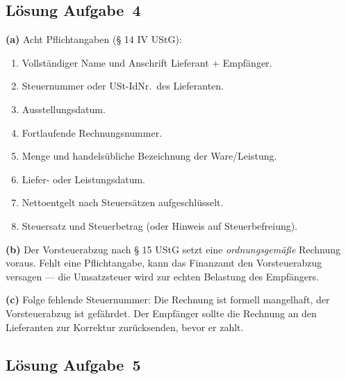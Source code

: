\documentclass[11pt, a4paper]{article}
\begin{document}
\subsection*{Lösung Aufgabe~4}

\begin{loesung}
\textbf{(a)} Acht Pflichtangaben (§ 14 IV UStG):
\begin{enumerate}[itemsep=0pt]
  \item Vollständiger Name und Anschrift Lieferant + Empfänger.
  \item Steuernummer oder USt-IdNr.\ des Lieferanten.
  \item Ausstellungsdatum.
  \item Fortlaufende Rechnungsnummer.
  \item Menge und handelsübliche Bezeichnung der Ware/Leistung.
  \item Liefer- oder Leistungsdatum.
  \item Nettoentgelt nach Steuersätzen aufgeschlüsselt.
  \item Steuersatz und Steuerbetrag (oder Hinweis auf Steuerbefreiung).
\end{enumerate}

\textbf{(b)} Der Vorsteuerabzug nach § 15 UStG setzt eine \emph{ordnungsgemäße}
Rechnung voraus. Fehlt eine Pflichtangabe, kann das Finanzamt den Vorsteuerabzug
versagen --- die Umsatzsteuer wird zur echten Belastung des Empfängers.

\textbf{(c)} Folge fehlende Steuernummer: Die Rechnung ist formell mangelhaft, der
Vorsteuerabzug ist gefährdet. Der Empfänger sollte die Rechnung an den Lieferanten
zur Korrektur zurücksenden, bevor er zahlt.
\end{loesung}

\subsection*{Lösung Aufgabe~5}
\end{document}
